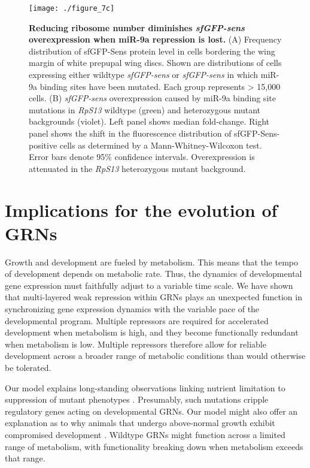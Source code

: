\begin{figure}[h!]
\centering
\texttt{[image: ./figure\_7c]}
\caption[Reducing ribosome number diminishes \textit{sfGFP-sens} overexpression.]{\textbf{Reducing ribosome number diminishes \textit{sfGFP-sens} overexpression when miR-9a repression is lost.} (A) Frequency distribution of sfGFP-Sens protein level in cells bordering the wing margin of white prepupal wing discs. Shown are distributions of cells expressing either wildtype \textit{sfGFP-sens} or \textit{sfGFP-sens} in which miR-9a binding sites have been mutated. Each group represents \textgreater{} 15,000 cells. (B) \textit{sfGFP-sens} overexpression caused by miR-9a binding site mutations in \textit{RpS13} wildtype (green) and heterozygous mutant backgrounds (violet). Left panel shows median fold-change. Right panel shows the shift in the fluorescence distribution of sfGFP-Sens-positive cells as determined by a Mann-Whitney-Wilcoxon test. Error bars denote 95\% confidence intervals. Overexpression is attenuated in the \textit{RpS13} heterozygous mutant background.}
\label{fig:metabolism:fig7c}
\end{figure}

\section{Implications for the evolution of GRNs}

Growth and development are fueled by metabolism. This means that the tempo of development depends on metabolic rate. Thus, the dynamics of developmental gene expression must faithfully adjust to a variable time scale. We have shown that multi-layered weak repression within GRNs plays an unexpected function in synchronizing gene expression dynamics with the variable pace of the developmental program. Multiple repressors are required for accelerated development when metabolism is high, and they become functionally redundant when metabolism is low. Multiple repressors therefore allow for reliable development across a broader range of metabolic conditions than would otherwise be tolerated.

Our model explains long-standing observations linking nutrient limitation to suppression of mutant phenotypes \cite{Morgan1915,Morgan1929}. Presumably, such mutations cripple regulatory genes acting on developmental GRNs. Our model might also offer an explanation as to why animals that undergo above-normal growth exhibit compromised development \cite{Arendt1997,Metcalfe2001}. Wildtype GRNs might function across a limited range of metabolism, with functionality breaking down when metabolism exceeds that range.

